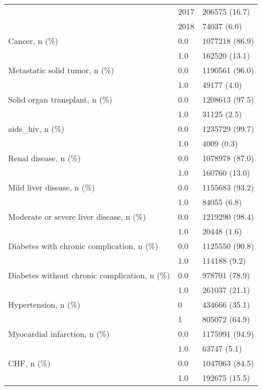 \begin{tabular}{lll}
                                       & 2017 &      206575 (16.7) \\
                                       & 2018 &        74037 (6.0) \\
Cancer, n (\%) & 0.0 &     1077218 (86.9) \\
                                       & 1.0 &      162520 (13.1) \\
Metastatic solid tumor, n (\%) & 0.0 &     1190561 (96.0) \\
                                       & 1.0 &        49177 (4.0) \\
Solid organ transplant, n (\%) & 0.0 &     1208613 (97.5) \\
                                       & 1.0 &        31125 (2.5) \\
aids\_hiv, n (\%) & 0.0 &     1235729 (99.7) \\
                                       & 1.0 &         4009 (0.3) \\
Renal disease, n (\%) & 0.0 &     1078978 (87.0) \\
                                       & 1.0 &      160760 (13.0) \\
Mild liver disease, n (\%) & 0.0 &     1155683 (93.2) \\
                                       & 1.0 &        84055 (6.8) \\
Moderate or severe liver disease, n (\%) & 0.0 &     1219290 (98.4) \\
                                       & 1.0 &        20448 (1.6) \\
Diabetes with chronic complication, n (\%) & 0.0 &     1125550 (90.8) \\
                                       & 1.0 &       114188 (9.2) \\
Diabetes without chronic complication, n (\%) & 0.0 &      978701 (78.9) \\
                                       & 1.0 &      261037 (21.1) \\
Hypertension, n (\%) & 0 &      434666 (35.1) \\
                                       & 1 &      805072 (64.9) \\
Myocardial infarction, n (\%) & 0.0 &     1175991 (94.9) \\
                                       & 1.0 &        63747 (5.1) \\
CHF, n (\%) & 0.0 &     1047063 (84.5) \\
                                       & 1.0 &      192675 (15.5) \\

\end{tabular}
